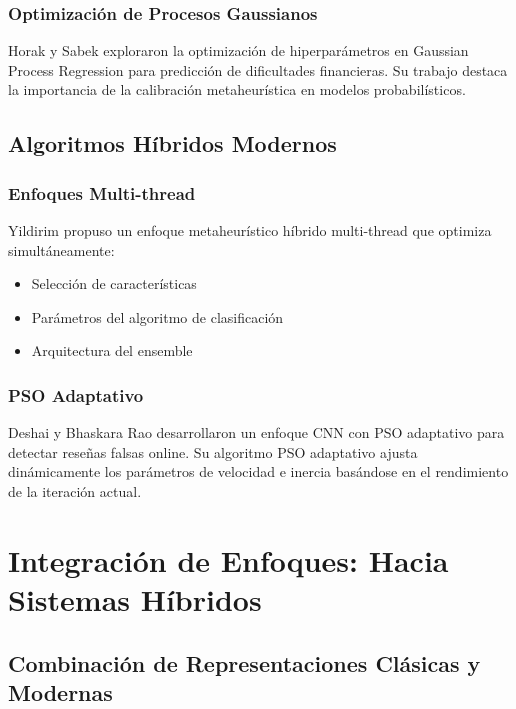 \subsubsection{Optimización de Procesos Gaussianos}

Horak y Sabek \cite{horak2023gaussian} exploraron la optimización de hiperparámetros en Gaussian Process Regression para predicción de dificultades financieras. Su trabajo destaca la importancia de la calibración metaheurística en modelos probabilísticos.

\subsection{Algoritmos Híbridos Modernos}

\subsubsection{Enfoques Multi-thread}

Yildirim \cite{yildirim2023novel} propuso un enfoque metaheurístico híbrido multi-thread que optimiza simultáneamente:
\begin{itemize}
    \item Selección de características
    \item Parámetros del algoritmo de clasificación
    \item Arquitectura del ensemble
\end{itemize}

\subsubsection{PSO Adaptativo}

Deshai y Bhaskara Rao \cite{deshai2023unmasking} desarrollaron un enfoque CNN con PSO adaptativo para detectar reseñas falsas online. Su algoritmo PSO adaptativo ajusta dinámicamente los parámetros de velocidad e inercia basándose en el rendimiento de la iteración actual.

\section{Integración de Enfoques: Hacia Sistemas Híbridos}
\label{sec:integracion_enfoques}

\subsection{Combinación de Representaciones Clásicas y Modernas}

